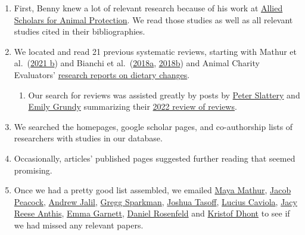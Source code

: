 \documentclass[
  letterpaper,
  DIV=11,
  numbers=noendperiod]{scrartcl}
\providecommand{\tightlist}{%
  \setlength{\itemsep}{0pt}\setlength{\parskip}{0pt}}\usepackage{longtable,booktabs,array}
\begin{document}
\begin{enumerate}
\def\labelenumi{\arabic{enumi}.}
\tightlist
\item
  First, Benny knew a lot of relevant research because of his work at
  \href{https://forum.effectivealtruism.org/posts/PwdjcsoeuH9E9hB8g/introducing-allied-scholars-for-animal-protection}{Allied
  Scholars for Animal Protection}. We read those studies as well as all
  relevant studies cited in their bibliographies.
\item
  We located and read 21 previous systematic reviews, starting with
  Mathur et
  al.~(\href{https://www.sciencedirect.com/science/article/pii/S0195666321001847}{2021
  b}) and Bianchi et
  al.~(\href{https://ijbnpa.biomedcentral.com/articles/10.1186/s12966-018-0729-6}{2018a},
  \href{https://www.thelancet.com/journals/lanplh/article/PIIS2542-5196(18)30188-8/fulltext}{2018b})
  and Animal Charity Evaluators'
  \href{https://animalcharityevaluators.org/research/reports/dietary-impacts/}{research
  reports on dietary changes}.

  \begin{enumerate}
  \def\labelenumii{\arabic{enumii}.}
  \tightlist
  \item
    Our search for reviews was assisted greatly by posts by
    \href{https://forum.effectivealtruism.org/posts/Sy7swEetrtcK2C7q6/research-summary-a-meta-review-of-interventions-that}{Peter
    Slattery} and
    \href{https://forum.effectivealtruism.org/posts/azHZ2pQj9JgdZLC63/what-interventions-influence-animal-product-consumption}{Emily
    Grundy} summarizing their
    \href{https://www.sciencedirect.com/science/article/pii/S2666833521000976\#!}{2022
    review of reviews}.
  \end{enumerate}
\item
  We searched the homepages, google scholar pages, and co-authorship
  lists of researchers with studies in our database.
\item
  Occasionally, articles' published pages suggested further reading that
  seemed promising.
\item
  Once we had a pretty good list assembled, we emailed
  \href{https://www.mayamathur.com/}{Maya Mathur},
  \href{https://www.jacobpeacock.com/}{Jacob Peacock},
  \href{https://www.oxy.edu/academics/faculty/andrew-jalil}{Andrew
  Jalil},
  \href{https://www.bc.edu/bc-web/schools/mcas/departments/psychology/people/faculty-directory/gregg-sparkman.html}{Gregg
  Sparkman}, \href{https://scholar.cgu.edu/joshua-tasoff/}{Joshua
  Tasoff}, \href{https://luciuscaviola.com/}{Lucius Caviola},
  \href{https://jacyanthis.com/}{Jacy Reese Anthis},
  \href{https://www.phc.ox.ac.uk/team/emma-garnett}{Emma Garnett},
  \href{https://www.daniellrosenfeld.com/}{Daniel Rosenfeld} and
  \href{https://www.kent.ac.uk/psychology/people/220/dhont-kristof}{Kristof
  Dhont} to see if we had missed any relevant papers.
\end{enumerate}
\end{document}
